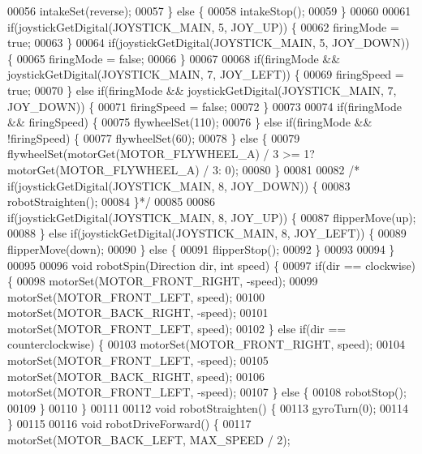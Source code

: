 \begin{DoxyCode}
00056     intakeSet(reverse);
00057   \} \textcolor{keywordflow}{else} \{
00058     intakeStop();
00059   \}
00060 
00061   \textcolor{keywordflow}{if}(joystickGetDigital(JOYSTICK_MAIN, 5, JOY_UP)) \{
00062     firingMode = \textcolor{keyword}{true};
00063   \}
00064   \textcolor{keywordflow}{if}(joystickGetDigital(JOYSTICK_MAIN, 5, JOY_DOWN)) \{
00065     firingMode = \textcolor{keyword}{false};
00066   \}
00067 
00068   \textcolor{keywordflow}{if}(firingMode && joystickGetDigital(JOYSTICK_MAIN, 7, JOY_LEFT)) \{
00069     firingSpeed = \textcolor{keyword}{true};
00070   \} \textcolor{keywordflow}{else} \textcolor{keywordflow}{if}(firingMode && joystickGetDigital(JOYSTICK_MAIN, 7, JOY_DOWN)) \{
00071     firingSpeed = \textcolor{keyword}{false};
00072   \}
00073 
00074   \textcolor{keywordflow}{if}(firingMode && firingSpeed) \{
00075     flywheelSet(110);
00076   \} \textcolor{keywordflow}{else} \textcolor{keywordflow}{if}(firingMode && !firingSpeed) \{
00077     flywheelSet(60);
00078   \} \textcolor{keywordflow}{else} \{
00079     flywheelSet(motorGet(MOTOR_FLYWHEEL_A) / 3 >= 1? motorGet(MOTOR_FLYWHEEL_A) / 3: 0);
00080   \}
00081 
00082 \textcolor{comment}{/*  if(joystickGetDigital(JOYSTICK\_MAIN, 8, JOY\_DOWN)) \{}
00083 \textcolor{comment}{    robotStraighten();}
00084 \textcolor{comment}{  \}*/}
00085 
00086   \textcolor{keywordflow}{if}(joystickGetDigital(JOYSTICK_MAIN, 8, JOY_UP)) \{
00087     flipperMove(up);
00088   \}  \textcolor{keywordflow}{else} \textcolor{keywordflow}{if}(joystickGetDigital(JOYSTICK_MAIN, 8, JOY_LEFT)) \{
00089     flipperMove(down);
00090   \} \textcolor{keywordflow}{else} \{
00091     flipperStop();
00092   \}
00093 
00094 \}
00095 
00096 \textcolor{keywordtype}{void} robotSpin(Direction dir, \textcolor{keywordtype}{int} speed) \{
00097   \textcolor{keywordflow}{if}(dir == clockwise) \{
00098     motorSet(MOTOR_FRONT_RIGHT, -speed);
00099     motorSet(MOTOR_FRONT_LEFT, speed);
00100     motorSet(MOTOR_BACK_RIGHT, -speed);
00101     motorSet(MOTOR_FRONT_LEFT, speed);
00102   \} \textcolor{keywordflow}{else} \textcolor{keywordflow}{if}(dir == counterclockwise) \{
00103     motorSet(MOTOR_FRONT_RIGHT, speed);
00104     motorSet(MOTOR_FRONT_LEFT, -speed);
00105     motorSet(MOTOR_BACK_RIGHT, speed);
00106     motorSet(MOTOR_FRONT_LEFT, -speed);
00107   \} \textcolor{keywordflow}{else} \{
00108     robotStop();
00109   \}
00110 \}
00111 
00112 \textcolor{keywordtype}{void} robotStraighten() \{
00113   gyroTurn(0);
00114 \}
00115 
00116 \textcolor{keywordtype}{void} robotDriveForward() \{
00117   motorSet(MOTOR_BACK_LEFT, MAX_SPEED / 2);

\end{DoxyCode}
